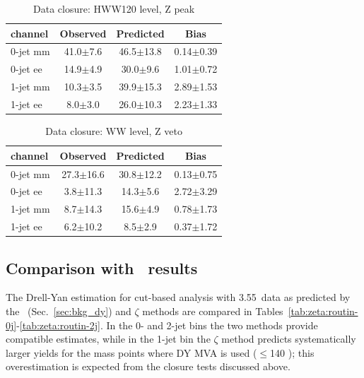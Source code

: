 \begin{table}[!hbtp]
{
 \begin{center}
 \begin{tabular}{l | c c c}
 \hline
channel       & Observed & Predicted & Bias \\
 \hline
0-jet  mm &   41.0$\pm$7.6   &   46.5$\pm$13.8  &   0.14$\pm$0.39    \\
0-jet  ee &   14.9$\pm$4.9   &   30.0$\pm$9.6   &   1.01$\pm$0.72    \\
 \hline
1-jet  mm &   10.3$\pm$3.5   &   39.9$\pm$15.3  &   2.89$\pm$1.53    \\
1-jet  ee &    8.0$\pm$3.0   &   26.0$\pm$10.3  &   2.23$\pm$1.33    \\
 \hline
\end{tabular}
\end{center}
}
\caption{Data closure: HWW120 level, Z peak}
\label{tab:zeta:datacloseHWWzp}
\end{table}

\begin{table}[!hbtp]
{
 \begin{center}
 \begin{tabular}{l | c c c}
 \hline
channel       & Observed & Predicted & Bias \\
 \hline
0-jet  mm &   27.3$\pm$16.6   &   30.8$\pm$12.2   &   0.13$\pm$0.75     \\
0-jet  ee &    3.8$\pm$11.3   &   14.3$\pm$5.6    &   2.72$\pm$3.29     \\
 \hline
1-jet  mm &    8.7$\pm$14.3   &   15.6$\pm$4.9    &   0.78$\pm$1.73     \\
1-jet  ee &    6.2$\pm$10.2   &    8.5$\pm$2.9    &   0.37$\pm$1.72     \\
 \hline
\end{tabular}
\end{center}
}
\caption{Data closure: WW level, Z veto}
\label{tab:zeta:datacloseWWzv}
\end{table}


\subsection{Comparison with \routin\ results}

The Drell-Yan estimation for cut-based analysis with 3.55~\ifb data as predicted by the \routin\ (Sec.~\ref{sec:bkg_dy}) and $\zeta$ methods are 
compared in Tables~\ref{tab:zeta:routin-0j}-\ref{tab:zeta:routin-2j}.
In the 0- and 2-jet bins the two methods provide compatible estimates, while in the 1-jet bin the $\zeta$ method predicts systematically larger yields for
the mass points where DY MVA is used (\mHi$\leq$140 \GeVcc); this overestimation is expected from the closure tests discussed above.

